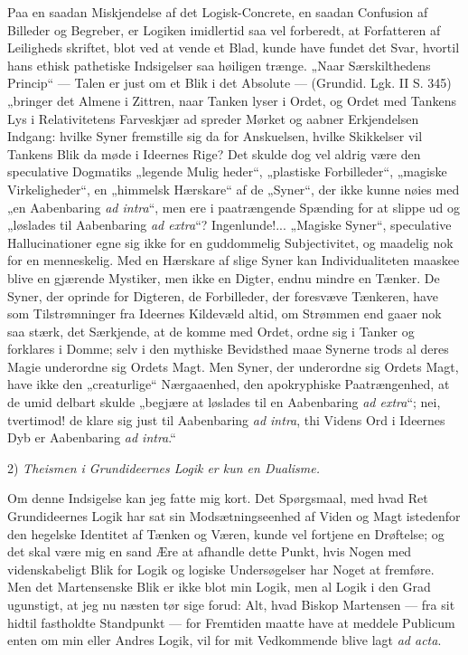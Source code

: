 \documentclass[12pt]{book}
\newcommand{\opage}[1]{\marginnote{\footnotesize\textit{[#1]}}}
\begin{document}
Paa en saadan Miskjendelse af det Logisk-Concrete, en
saadan Confusion af Billeder og Begreber, er Logiken
imidlertid saa vel forberedt, at Forfatteren af Leiligheds\-%
skriftet, blot ved at vende et Blad, kunde have fundet det
Svar, hvortil hans ethisk pathetiske Indsigelser saa høiligen
trænge. „Naar Særskilthedens Princip“ --- Talen er just
om et Blik i det Absolute --- (Grundid. Lgk. II S. 345)
„bringer det Almene i Zittren, naar Tanken lyser i Ordet,
og Ordet med Tankens Lys i Relativitetens Farveskjær ad\-%
spreder Mørket og aabner Erkjendelsen Indgang: hvilke
Syner fremstille sig da for Anskuelsen, hvilke Skikkelser
vil Tankens Blik da møde i Ideernes Rige? Det skulde
dog vel aldrig være den speculative Dogmatiks „legende Mulig\-%
heder“, „plastiske Forbilleder“, „magiske Virkeligheder“, en
„himmelsk Hærskare“ af de „Syner“, der ikke kunne nøies med
„en Aabenbaring \textit{ad intra}“, men ere i paatrængende Spænding
for at slippe ud og „løslades til Aabenbaring \textit{ad extra}“?
Ingenlunde!... „Magiske Syner“, speculative Hallucinationer
egne sig ikke for en guddommelig Subjectivitet, og maadelig nok
for en menneskelig. Med en Hærskare af slige Syner kan
Individualiteten maaskee blive en gjærende Mystiker, men
ikke en Digter, endnu mindre en Tænker. De Syner, der
oprinde for Digteren, de Forbilleder, der foresvæve Tænkeren,
have som Tilstrømninger fra Ideernes Kildevæld altid, om
Strømmen end gaaer nok saa stærk, det Særkjende, at de komme
med Ordet, ordne sig i Tanker og forklares i Domme; selv
i den mythiske Bevidsthed maae Synerne trods al deres
Magie underordne sig Ordets Magt. Men Syner, der
underordne sig Ordets Magt, have ikke den „creaturlige“
Nærgaaenhed, den apokryphiske Paatrængenhed, at de umid\-%
delbart skulde „begjære at løslades til en Aabenbaring \textit{ad
extra}“; nei, tvertimod! de klare sig just til Aabenbaring
\opage{131}\setcounter{footnote}{0}%
\textit{ad intra}, thi Videns Ord i Ideernes Dyb er Aabenbaring
\textit{ad intra}.“

2) \emph{Theismen i Grundideernes Logik er kun en
Dualisme.}%

Om denne Indsigelse kan jeg fatte mig kort. Det
Spørgsmaal, med hvad Ret Grundideernes Logik har sat
sin Modsætningseenhed af Viden og Magt istedenfor den
hegelske Identitet af Tænken og Væren, kunde vel fortjene
en Drøftelse; og det skal være mig en sand Ære at afhandle
dette Punkt, hvis Nogen med videnskabeligt Blik for Logik
og logiske Undersøgelser har Noget at fremføre. Men det
Martensenske Blik er ikke blot min Logik, men al Logik i den
Grad ugunstigt, at jeg nu næsten tør sige forud: Alt, hvad
Biskop Martensen --- fra sit hidtil fastholdte Standpunkt ---
for Fremtiden maatte have at meddele Publicum enten om
min eller Andres Logik, vil for mit Vedkommende blive
lagt \textit{ad acta}.
\end{document}
